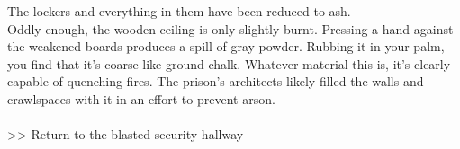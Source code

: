 The lockers and everything in them have been reduced to ash.\\

Oddly enough, the wooden ceiling is only slightly burnt. Pressing a hand against the weakened boards produces a spill of gray powder. Rubbing it in your palm, you find that it's coarse like ground chalk. Whatever material this is, it's clearly capable of quenching fires. The prison's architects likely filled the walls and crawlspaces with it in an effort to prevent arson.\\
\\

>> Return to the blasted security hallway -- 